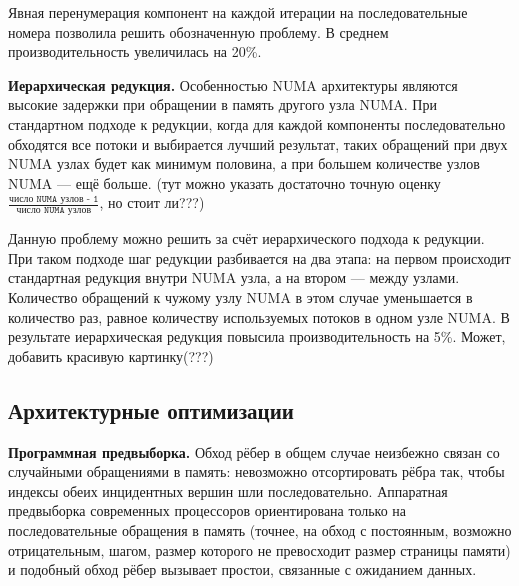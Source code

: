 \documentclass[a4paper,10pt]{extarticle}
\begin{document}
Явная перенумерация компонент на каждой итерации на последовательные номера позволила решить обозначенную проблему. В среднем производительность увеличилась на 20\%.


\textbf{Иерархическая редукция.}
Особенностью NUMA архитектуры являются высокие задержки при обращении в память другого узла NUMA.
При стандартном подходе к редукции, когда для каждой компоненты последовательно обходятся все потоки и выбирается лучший результат, таких обращений при двух NUMA узлах будет как минимум половина, а при большем количестве узлов NUMA --- ещё больше.
(тут можно указать достаточно точную оценку $\displaystyle \frac{\texttt{число NUMA узлов - 1}}{\texttt{число NUMA узлов}}$, но стоит ли???)

Данную проблему можно решить за счёт иерархического подхода к редукции. При таком подходе шаг редукции разбивается на два этапа: на первом происходит стандартная редукция внутри NUMA узла, а на втором  --- между узлами. Количество обращений к чужому узлу NUMA в этом случае уменьшается в количество раз, равное количеству используемых потоков в одном узле NUMA. В результате иерархическая редукция повысила производительность на 5\%.
Может, добавить красивую картинку(???)


\subsection{Архитектурные оптимизации}

\textbf{Программная предвыборка.}
Обход рёбер в общем случае неизбежно связан со случайными обращениями в память: невозможно отсортировать рёбра так, чтобы индексы обеих инцидентных вершин шли последовательно.
Аппаратная предвыборка современных процессоров ориентирована только на последовательные обращения в память (точнее, на обход с постоянным, возможно отрицательным, шагом, размер которого не превосходит размер страницы памяти) и подобный обход рёбер вызывает простои, связанные с ожиданием данных.
\end{document}

